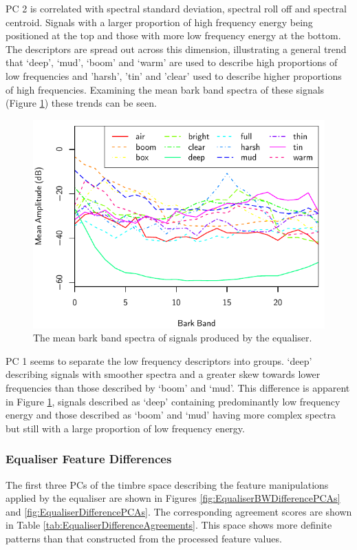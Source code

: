 			PC 2 is correlated with spectral standard deviation, spectral roll off and spectral centroid.
			Signals with a larger proportion of high frequency energy being positioned at the top and those
			with more low frequency energy at the bottom. The descriptors are spread out across this dimension,
			illustrating a general trend that `deep', `mud', `boom' and `warm' are used to describe high
			proportions of low frequencies and 'harsh', 'tin' and 'clear' used to describe higher proportions
			of high frequencies. Examining the mean bark band spectra of these signals (Figure
			\ref{fig:EqualiserProcessedSpectra}) these trends can be seen. 

			\begin{figure}[h!]
				\centering
				\includegraphics{chapter4/Images/EqualiserProcessedSpectra.pdf}
				\caption{The mean bark band spectra of signals produced by the equaliser.}
				\label{fig:EqualiserProcessedSpectra}
			\end{figure}

			PC 1 seems to separate the low frequency descriptors into groups. `deep' describing signals with
			smoother spectra and a greater skew towards lower frequencies than those described by `boom' and
			`mud'. This difference is apparent in Figure \ref{fig:EqualiserProcessedSpectra}, signals described
			as `deep' containing predominantly low frequency energy and those described as `boom' and `mud'
			having more complex spectra but still with a large proportion of low frequency energy.

		\subsubsection*{Equaliser Feature Differences}
			The first three PCs of the timbre space describing the feature manipulations applied by the
			equaliser are shown in Figures \ref{fig:EqualiserBWDifferencePCAs} and
			\ref{fig:EqualiserDifferencePCAs}. The corresponding agreement scores are shown in Table
			\ref{tab:EqualiserDifferenceAgreements}. This space shows more definite patterns than that
			constructed from the processed feature values.


